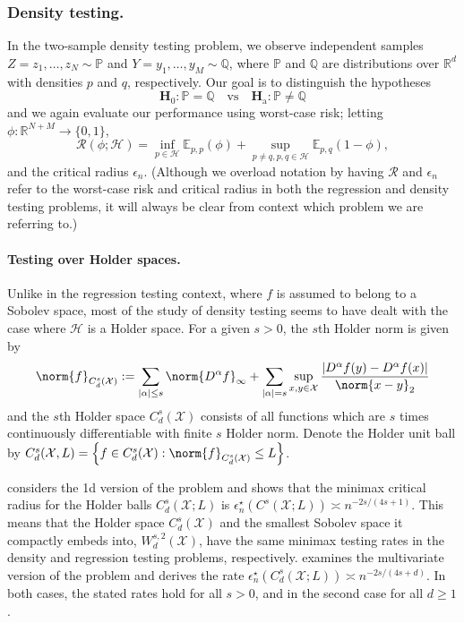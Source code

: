 \documentclass{article}
\newcommand{\Reals}{\mathbb{R}}
\newcommand{\abs}[1]{\left \lvert #1 \right \rvert}
\newcommand{\set}[1]{\left\{#1\right\}}
\newcommand{\1}{\mathbf{1}}
\newcommand{\Pbb}{\mathbb{P}}
\newcommand{\Ebb}{\mathbb{E}}
\newcommand{\Qbb}{\mathbb{Q}}
\theoremstyle{alden}
\theoremstyle{aldenthm}
\theoremstyle{definition}
\theoremstyle{remark}
\begin{document}
\subsubsection{Density testing.}
\label{subsubsec:density_testing}

In the two-sample density testing problem, we observe independent samples $Z = z_1,\ldots,z_N \sim \Pbb$ and $Y = y_1,\ldots,y_M \sim \Qbb$, where $\Pbb$ and $\Qbb$ are distributions over $\Reals^d$ with densities $p$ and $q$, respectively. Our goal is to distinguish the hypotheses
\begin{equation*}
\mathbf{H}_0: \Pbb = \Qbb \quad \textrm{vs} \quad \mathbf{H}_{\textrm{a}}: \Pbb \neq \Qbb
\end{equation*}
and we again evaluate our performance using worst-case risk; letting $\phi:\Reals^{N + M} \to \{0,1\}$, 
\begin{equation*}
\mathcal{R}(\phi; \mathcal{H}) = \inf_{p \in \mathcal{H}}\Ebb_{p,p}(\phi) + \sup_{p \neq q, p,q \in \mathcal{H}} \Ebb_{p,q}(1 - \phi),
\end{equation*}
and the critical radius $\epsilon_n$. (Although we overload notation by having $\mathcal{R}$ and $\epsilon_n$ refer to the worst-case risk and critical radius in both the regression and density testing problems, it will always be clear from context which problem we are referring to.)

\paragraph{Testing over Holder spaces.} Unlike in the regression testing context, where $f$ is assumed to belong to a Sobolev space, most of the study of density testing seems to have dealt with the case where $\mathcal{H}$ is a Holder space. For a given $s > 0$, the $s$th Holder norm is given by
\begin{equation*}
\norm{f}_{C_d^{s}(\mathcal{X})} := \sum_{\abs{\alpha} \leq s} \norm{D^{\alpha}f}_{\infty} + \sum_{\abs{\alpha} = s} \sup_{x,y \in \mathcal{X}} \frac{\abs{D^{\alpha}f(y) - D^{\alpha}f(x)}}{\norm{x - y}_2}
\end{equation*}
and the $s$th Holder space $C_d^{s}(\mathcal{X})$ consists of all functions which are $s$ times continuously differentiable with finite $s$ Holder norm. Denote the Holder unit ball by $C_d^{s}(\mathcal{X},L) = \set{f \in C_d^{s}(\mathcal{X}): \norm{f}_{C_d^{s}(\mathcal{X})} \leq L}$.

\citet{ingster87} considers the 1d version of the problem and shows that the minimax critical radius for the Holder balls $C_d^{s}(\mathcal{X};L)$ is $\epsilon_n^{\star}(C^{s}(\mathcal{X};L)) \asymp n^{-2s/(4s + 1)}$. This means that the Holder space $C_d^{s}(\mathcal{X})$ and the smallest Sobolev space it compactly embeds into, $W_d^{s,2}(\mathcal{X})$, have the same minimax testing rates in the density and regression testing problems, respectively. \cite{ariascastro18} examines the multivariate version of the problem and derives the rate $\epsilon_n^{\star}(C_d^{s}(\mathcal{X};L)) \asymp n^{-2s/(4s + d)}$. In both cases, the stated rates hold for all $s > 0$, and in the second case for all $d \geq 1$. 
\end{document}
